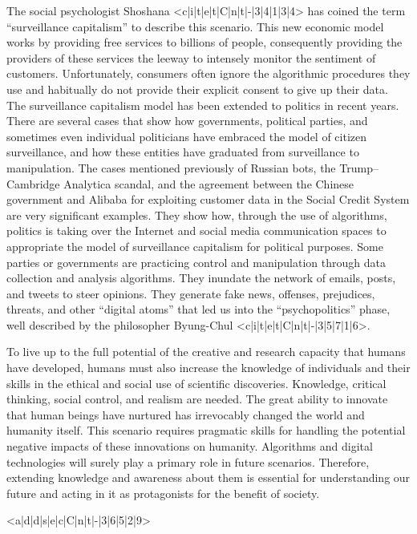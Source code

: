 The social psychologist Shoshana <c|i|t|e|t|C|n|t|-|3|4|1|3|4> has coined the term ``surveillance capitalism'' to describe this scenario. This new economic model works by providing free services to billions of people, consequently providing the providers of these services the leeway to intensely monitor the sentiment of customers. Unfortunately, consumers often ignore the algorithmic procedures they use and habitually do not provide their explicit consent to give up their data. The surveillance capitalism model has been extended to politics in recent years. There are \hbox{several} cases that show how governments, political parties, and sometimes even individual politicians have embraced the model of citizen surveillance, and how these entities have graduated from surveillance to manipulation. The cases mentioned previously of Russian bots, the Trump--Cambridge Analytica scandal, and the agreement between the Chinese government and Alibaba for exploiting \hbox{customer} data in the Social Credit System are very significant examples. They show how, through the use of algorithms, politics is taking over the Internet and social media communication spaces to appropriate the model of surveillance capitalism for political purposes. Some parties or governments are practicing control and manipulation through data collection and analysis algorithms. They inundate the network of emails, posts, and tweets to steer opinions. They generate fake news, offenses, prejudices, threats, and other ``digital atoms'' that led us into the ``psychopolitics'' phase, well described by the philosopher Byung-Chul <c|i|t|e|t|C|n|t|-|3|5|7|1|6>.

To live up to the full potential of the creative and research capacity that humans have developed, humans must also increase the knowledge of individuals and their skills in the ethical and social use of scientific discoveries. Knowledge, critical thinking, social control, and realism are needed. The great ability to innovate that human beings have nurtured has irrevocably changed the world and humanity itself. This scenario requires pragmatic skills for handling the potential negative impacts of these innovations on humanity. Algorithms and digital technologies will surely play a primary role in future scenarios. Therefore, extending knowledge and awareness about them is essential for understanding our future and acting in it as protagonists for the benefit of society.

<a|d|d|s|e|c|C|n|t|-|3|6|5|2|9>

